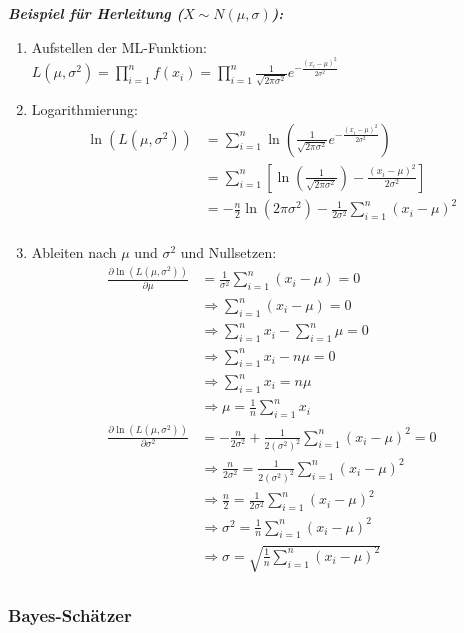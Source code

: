 \textbf{\emph{Beispiel für Herleitung (\(X\sim N(\mu, \sigma)\)):}}

\begin{enumerate}
    \item Aufstellen der ML-Funktion: \(L(\mu, \sigma^2)=\prod_{i=1}^{n}f(x_i)=\prod_{i=1}^{n}\frac{1}{\sqrt{2\pi\sigma^2}}e^{-\frac{(x_i-\mu)^2}{2\sigma^2}}\)
    \item Logarithmierung:\\
        \begin{equation*}
            \begin{split}
            \ln(L(\mu, \sigma^2))&=\sum_{i=1}^{n}\ln(\frac{1}{\sqrt{2\pi\sigma^2}}e^{-\frac{(x_i-\mu)^2}{2\sigma^2}})\\
            &=\sum_{i=1}^{n}\left [ \ln(\frac{1}{\sqrt{2\pi\sigma^2}})-\frac{(x_i-\mu)^2}{2\sigma^2}\right ]\\
            &=-\frac{n}{2}\ln(2\pi\sigma^2)-\frac{1}{2\sigma^2}\sum_{i=1}^{n}(x_i-\mu)^2\\
            \end{split}
        \end{equation*}
    \item Ableiten nach \(\mu\) und \(\sigma^2\) und Nullsetzen:\\
        \begin{equation*}
            \begin{split}
            \frac{\partial \ln(L(\mu, \sigma^2))}{\partial \mu}&=\frac{1}{\sigma^2}\sum_{i=1}^{n}(x_i-\mu)=0\\
            &\Rightarrow \sum_{i=1}^{n}(x_i-\mu)=0\\
            &\Rightarrow \sum_{i=1}^{n}x_i-\sum_{i=1}^{n}\mu=0\\
            &\Rightarrow \sum_{i=1}^{n}x_i-n\mu=0\\
            &\Rightarrow \sum_{i=1}^{n}x_i=n\mu\\
            &\Rightarrow \mu=\frac{1}{n}\sum_{i=1}^{n}x_i\\
            \frac{\partial \ln(L(\mu, \sigma^2))}{\partial \sigma^2}&=-\frac{n}{2\sigma^2}+\frac{1}{2(\sigma^2)^2}\sum_{i=1}^{n}(x_i-\mu)^2=0\\
            &\Rightarrow \frac{n}{2\sigma^2}=\frac{1}{2(\sigma^2)^2}\sum_{i=1}^{n}(x_i-\mu)^2\\
            &\Rightarrow \frac{n}{2}=\frac{1}{2\sigma^2}\sum_{i=1}^{n}(x_i-\mu)^2\\
            &\Rightarrow \sigma^2=\frac{1}{n}\sum_{i=1}^{n}(x_i-\mu)^2\\
            &\Rightarrow \sigma=\sqrt{\frac{1}{n}\sum_{i=1}^{n}(x_i-\mu)^2}\\
            \end{split}
        \end{equation*}
\end{enumerate}

\subsubsection{Bayes-Schätzer}
